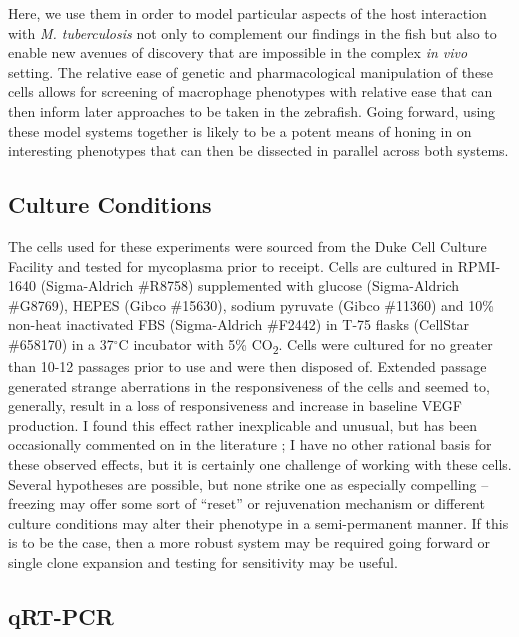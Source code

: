 Here, we use them in order to model particular aspects of the host interaction with \textit{M. tuberculosis} not only to complement our findings in the fish but also to enable new avenues of discovery that are impossible in the complex \textit{in vivo} setting. The relative ease of genetic and pharmacological manipulation of these cells allows for screening of macrophage phenotypes with relative ease that can then inform later approaches to be taken in the zebrafish. Going forward, using these model systems together is likely to be a potent means of honing in on interesting phenotypes that can then be dissected in parallel across both systems. 

\subsection{Culture Conditions}\label{thp1culture}

The cells used for these experiments were sourced from the Duke Cell Culture Facility and tested for mycoplasma prior to receipt. Cells are cultured in RPMI-1640 (Sigma-Aldrich \#R8758) supplemented with glucose (Sigma-Aldrich \#G8769), HEPES (Gibco \#15630), sodium pyruvate (Gibco \#11360) and 10\% non-heat inactivated FBS (Sigma-Aldrich \#F2442) in T-75 flasks (CellStar \#658170) in a 37$^{\circ}$C incubator with 5\% CO\textsubscript{2}. Cells were cultured for no greater than 10-12 passages prior to use and were then disposed of. Extended passage generated strange aberrations in the responsiveness of the cells and seemed to, generally, result in a loss of responsiveness and increase in baseline VEGF production. I found this effect rather inexplicable and unusual, but has been occasionally commented on in the literature \citep{An2009, Chanput2015, Gazova2020, Lund2016, Stokes1999}; I have no other rational basis for these observed effects, but it is certainly one challenge of working with these cells. Several hypotheses are possible, but none strike one as especially compelling -- freezing may offer some sort of ``reset'' or rejuvenation mechanism or different culture conditions may alter their phenotype in a semi-permanent manner. If this is to be the case, then a more robust system may be required going forward or single clone expansion and testing for sensitivity may be useful.

\subsection{qRT-PCR}\label{qrtpcr}

